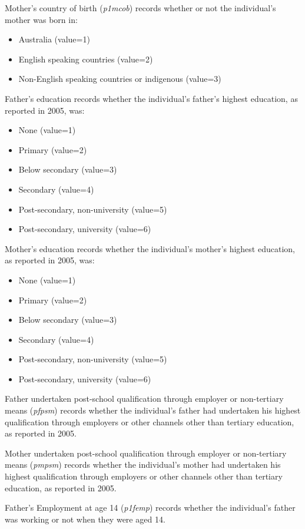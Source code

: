 \documentclass[12pt, a4paper]{article}
\begin{document}
Mother’s country of birth (\textit{p1\textunderscore{}mcob}) records whether or not the individual’s mother was born in:
\begin{itemize}
  \item Australia (value=1)
  \item English speaking countries (value=2)
  \item Non-English speaking countries or indigenous (value=3)
\end{itemize}  

Father’s education records whether the individual’s father’s highest education, as reported in 2005, was:
\begin{itemize}
  \item None (value=1)
  \item Primary (value=2)
  \item Below secondary (value=3)
  \item Secondary (value=4)
  \item Post-secondary, non-university (value=5)
  \item Post-secondary, university (value=6)
\end{itemize}  

Mother’s education records whether the individual’s mother’s highest education, as reported in 2005, was:
\begin{itemize}
  \item None (value=1)
  \item Primary (value=2)
  \item Below secondary (value=3)
  \item Secondary (value=4)
  \item Post-secondary, non-university (value=5)
  \item Post-secondary, university (value=6)
\end{itemize}  

Father undertaken post-school qualification through employer or non-tertiary means (\textit{p\textunderscore{}fpsm}) records whether the individual’s father had undertaken his highest qualification through employers or other channels other than tertiary education, as reported in 2005. 

Mother undertaken post-school qualification through employer or non-tertiary means (\textit{p\textunderscore{}mpsm}) records whether the individual’s mother had undertaken his highest qualification through employers or other channels other than tertiary education, as reported in 2005. 

Father’s Employment at age 14 (\textit{p1\textunderscore{}femp}) records whether the individual’s father was working or not when they were aged 14. 
\end{document}

